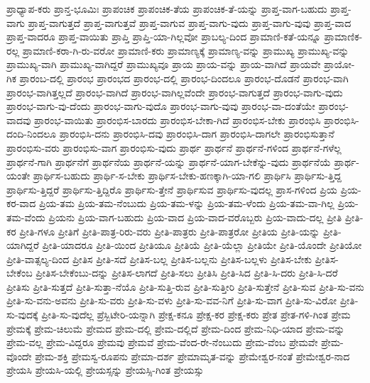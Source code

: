 {ಪ್ರಾಧ್ಯಾಪ-ಕರು
ಪ್ರಾನ್ತ-ಭೂಮಿಃ
ಪ್ರಾಪಂಚಿಕ
ಪ್ರಾಪಂಚಿಕ-ತೆಯ
ಪ್ರಾಪಂಚಿಕ-ತೆ-ಯನ್ನು
ಪ್ರಾಪ್ತ-ವಾಗ-ಬಹುದು
ಪ್ರಾಪ್ತ-ವಾಗು
ಪ್ರಾಪ್ತ-ವಾಗುತ್ತದೆ
ಪ್ರಾಪ್ತ-ವಾಗುತ್ತವೆ
ಪ್ರಾಪ್ತ-ವಾಗುವ
ಪ್ರಾಪ್ತ-ವಾಗು-ವುದು
ಪ್ರಾಪ್ತ-ವಾಗು-ವುವು
ಪ್ರಾಪ್ತ-ವಾದ
ಪ್ರಾಪ್ತ-ವಾದರೂ
ಪ್ರಾಪ್ತ-ವಾಯಿತು
ಪ್ರಾಪ್ತಿ
ಪ್ರಾಪ್ತಿ-ಯಾ-ಗಿಲ್ಲವೋ
ಪ್ರಾಬಲ್ಯ-ದಿಂದ
ಪ್ರಾಮಾಣಿ-ಕತೆ-ಯನ್ನೂ
ಪ್ರಾಮಾಣಿಕ-ರಲ್ಲ
ಪ್ರಾಮಾಣಿ-ಕರಾ-ಗಿ-ರು-ವರೋ
ಪ್ರಾಮಾಣಿ-ಕರು
ಪ್ರಾಮಾಣ್ಯಕ್ಕೆ
ಪ್ರಾಮಾಣ್ಯ-ವನ್ನು
ಪ್ರಾಮುಖ್ಯ
ಪ್ರಾಮುಖ್ಯ-ವನ್ನು
ಪ್ರಾಮುಖ್ಯ-ವಾಗಿ
ಪ್ರಾಮುಖ್ಯ-ವಾಗಿದ್ದರೆ
ಪ್ರಾಮುಖ್ಯವೂ
ಪ್ರಾಯ
ಪ್ರಾಯ-ವನ್ನು
ಪ್ರಾಯ-ವಾಗಿದೆ
ಪ್ರಾಯವೇ
ಪ್ರಾಯೋ-ಗಿಕ
ಪ್ರಾರಂಬ-ದಲ್ಲಿ
ಪ್ರಾರಂಭ
ಪ್ರಾರಂಭದ
ಪ್ರಾರಂಭ-ದಲ್ಲಿ
ಪ್ರಾರಂಭ-ದಿಂದಲೂ
ಪ್ರಾರಂಭ-ದೊಡನೆ
ಪ್ರಾರಂಭ-ವಾಗಿ
ಪ್ರಾರಂಭ-ವಾಗಿತ್ತಲ್ಲದೆ
ಪ್ರಾರಂಭ-ವಾಗಿದೆ
ಪ್ರಾರಂಭ-ವಾಗಿಲ್ಲವೆಂದೇ
ಪ್ರಾರಂಭ-ವಾಗುತ್ತದೆ
ಪ್ರಾರಂಭ-ವಾಗು-ವುದು
ಪ್ರಾರಂಭ-ವಾಗು-ವು-ದೆಂದು
ಪ್ರಾರಂಭ-ವಾಗು-ವುದೊ
ಪ್ರಾರಂಭ-ವಾಗು-ವುವು
ಪ್ರಾರಂಭ-ವಾ-ದಂತೆಯೇ
ಪ್ರಾರಂಭ-ವಾದವು
ಪ್ರಾರಂಭ-ವಾಯಿತು
ಪ್ರಾರಂಭಿಸ-ಬಾರದು
ಪ್ರಾರಂಭಿಸ-ಬೇಕಾ-ಗಿದೆ
ಪ್ರಾರಂಭಿಸ-ಬೇಕು
ಪ್ರಾರಂಭಿಸಿ
ಪ್ರಾರಂಭಿಸಿ-ದಂದಿ-ನಿಂದಲೂ
ಪ್ರಾರಂಭಿಸಿ-ದನು
ಪ್ರಾರಂಭಿಸಿ-ದವು
ಪ್ರಾರಂಭಿಸಿ-ದಾಗ
ಪ್ರಾರಂಭಿಸಿ-ದಾಗಲೇ
ಪ್ರಾರಂಭಿಸುತ್ತಾನೆ
ಪ್ರಾರಂಭಿಸು-ವರು
ಪ್ರಾರಂಭಿಸು-ವಾಗ
ಪ್ರಾರಂಭಿಸು-ವುದು
ಪ್ರಾರ್ಥ
ಪ್ರಾರ್ಥನೆ
ಪ್ರಾರ್ಥನೆ-ಗಳಿಂದ
ಪ್ರಾರ್ಥನೆ-ಗಳೆಲ್ಲ
ಪ್ರಾರ್ಥನೆ-ಗಾಗಿ
ಪ್ರಾರ್ಥನೆಗೆ
ಪ್ರಾರ್ಥನೆಯ
ಪ್ರಾರ್ಥನೆ-ಯನ್ನು
ಪ್ರಾರ್ಥನೆ-ಯಾಗ-ಬೇಕೆನ್ನು-ವುದು
ಪ್ರಾರ್ಥನೆಯೆ
ಪ್ರಾರ್ಥ-ಯಂತೇ
ಪ್ರಾರ್ಥಿಸ-ಬಹುದು
ಪ್ರಾರ್ಥಿ-ಸ-ಬೇಕು
ಪ್ರಾರ್ಥಿಸ-ಬೇಕು-ಹಣಕ್ಕಾಗಿ-ಯಾ-ಗಲಿ
ಪ್ರಾರ್ಥಿಸಿ
ಪ್ರಾರ್ಥಿಸು-ತ್ತಿದ್ದ
ಪ್ರಾರ್ಥಿಸು-ತ್ತಿದ್ದರೆ
ಪ್ರಾರ್ಥಿಸು-ತ್ತಿದ್ದಿರೊ
ಪ್ರಾರ್ಥಿಸು-ತ್ತೇನೆ
ಪ್ರಾರ್ಥಿಸುವ
ಪ್ರಾರ್ಥಿಸು-ವುದಲ್ಲ
ಪ್ರಾಸ-ಗಳಿಂದ
ಪ್ರಿಯ
ಪ್ರಿಯ-ಕರ-ವಾದ
ಪ್ರಿಯ-ತಮ
ಪ್ರಿಯ-ತಮ-ನೆಂಬುದು
ಪ್ರಿಯ-ತಮ-ಳನ್ನು
ಪ್ರಿಯ-ತಮ-ಳೆಂದು
ಪ್ರಿಯ-ತಮ-ವಾ-ಗಿಲ್ಲ
ಪ್ರಿಯ-ತಮ-ವೆಂದು
ಪ್ರಿಯನು
ಪ್ರಿಯ-ವಾಗ-ಬಹುದು
ಪ್ರಿಯ-ವಾದ
ಪ್ರಿಯ-ವಾದ-ವರೊಬ್ಬರು
ಪ್ರಿಯ-ವಾದು-ದಲ್ಲ
ಪ್ರೀತಿ
ಪ್ರೀತಿ-ಕರ
ಪ್ರೀತಿ-ಗಳೂ
ಪ್ರೀತಿಗೆ
ಪ್ರೀತಿ-ಪಾತ್ರ-ರಿರು-ವರು
ಪ್ರೀತಿ-ಪಾತ್ರರು
ಪ್ರೀತಿ-ಪಾತ್ರರೋ
ಪ್ರೀತಿಯ
ಪ್ರೀತಿ-ಯನ್ನು
ಪ್ರೀತಿ-ಯಾಗಿದ್ದರೆ
ಪ್ರೀತಿ-ಯಾದರೂ
ಪ್ರೀತಿ-ಯಿಂದ
ಪ್ರೀತಿಯೂ
ಪ್ರೀತಿಯೆ
ಪ್ರೀತಿ-ಯೆಲ್ಲಾ
ಪ್ರೀತಿಯೇ
ಪ್ರೀತಿ-ಯೊಂದೇ
ಪ್ರೀತಿಯೋ
ಪ್ರೀತಿ-ವಾತ್ಸಲ್ಯ-ದಿಂದ
ಪ್ರೀತಿಸ
ಪ್ರೀತಿ-ಸದೆ
ಪ್ರೀತಿಸ-ಬಲ್ಲ
ಪ್ರೀತಿಸ-ಬಲ್ಲನು
ಪ್ರೀತಿಸ-ಬಲ್ಲಳು
ಪ್ರೀತಿಸ-ಬೇಕು
ಪ್ರೀತಿಸ-ಬೇಕೆಂಬ
ಪ್ರೀತಿಸ-ಬೇಕೆಂಬು-ದನ್ನು
ಪ್ರೀತಿಸ-ಲಾಗದೆ
ಪ್ರೀತಿ-ಸಲು
ಪ್ರೀತಿಸಿ
ಪ್ರೀತಿ-ಸಿದ
ಪ್ರೀತಿ-ಸಿ-ದರು
ಪ್ರೀತಿ-ಸಿ-ದರೆ
ಪ್ರೀತಿಸು
ಪ್ರೀತಿ-ಸುತ್ತದೆ
ಪ್ರೀತಿ-ಸುತ್ತಾ-ನೆಯೊ
ಪ್ರೀತಿ-ಸುತ್ತಿ-ರುವ
ಪ್ರೀತಿ-ಸುತ್ತೀರಿ
ಪ್ರೀತಿ-ಸುತ್ತೇನೆ
ಪ್ರೀತಿ-ಸುವ
ಪ್ರೀತಿ-ಸು-ವನು
ಪ್ರೀತಿ-ಸು-ವನು-ಅವನು
ಪ್ರೀತಿ-ಸು-ವರು
ಪ್ರೀತಿ-ಸು-ವಳು
ಪ್ರೀತಿ-ಸು-ವವ-ನಿಗೆ
ಪ್ರೀತಿ-ಸು-ವಾಗ
ಪ್ರೀತಿ-ಸು-ವಿರೋ
ಪ್ರೀತಿ-ಸು-ವುದಕ್ಕೆ
ಪ್ರೀತಿ-ಸು-ವುದೆಲ್ಲ
ಪ್ರೆಸ್ಬಿಟೇರಿ-ಯನ್ನಾಗಿ
ಪ್ರೇಕ್ಷ-ಕನೂ
ಪ್ರೇಕ್ಷ-ಕರ
ಪ್ರೇಕ್ಷ-ಕರು
ಪ್ರೇತ
ಪ್ರೇತ-ಗಳಿ-ಗಿಂತ
ಪ್ರೇಮ
ಪ್ರೇಮಕ್ಕೆ
ಪ್ರೇಮ-ಚಿಲುಮೆ
ಪ್ರೇಮದ
ಪ್ರೇಮ-ದಲ್ಲಿ
ಪ್ರೇಮ-ದಲ್ಲಿದೆ
ಪ್ರೇಮ-ದಿಂದ
ಪ್ರೇಮ-ನಿಧಿ-ಯಾದ
ಪ್ರೇಮ-ವನ್ನು
ಪ್ರೇಮ-ವಲ್ಲ
ಪ್ರೇಮ-ವಿದ್ದರೂ
ಪ್ರೇಮವು
ಪ್ರೇಮವೆ
ಪ್ರೇಮ-ವೆಂದ-ರೇ-ನೆಂಬುದು
ಪ್ರೇಮ-ವೆಂಬ
ಪ್ರೇಮವೇ
ಪ್ರೇಮ-ವೊಂದೇ
ಪ್ರೇಮ-ಶಕ್ತಿ
ಪ್ರೇಮಸ್ವ-ರೂಪನು
ಪ್ರೇಮಾ-ದರ್ಶ
ಪ್ರೇಮಾಮೃತ-ವನ್ನು
ಪ್ರೇಮೇಶ್ವರ-ನಂತೆ
ಪ್ರೇಮೇಶ್ವರ-ನಾದ
ಪ್ರೇಯಸಿ
ಪ್ರೇಯಸಿ-ಯಲ್ಲಿ
ಪ್ರೇಯಸ್ಸನ್ನು
ಪ್ರೇಯಸ್ಸಿ-ಗಿಂತ
ಪ್ರೇಯಸ್ಸು
}
